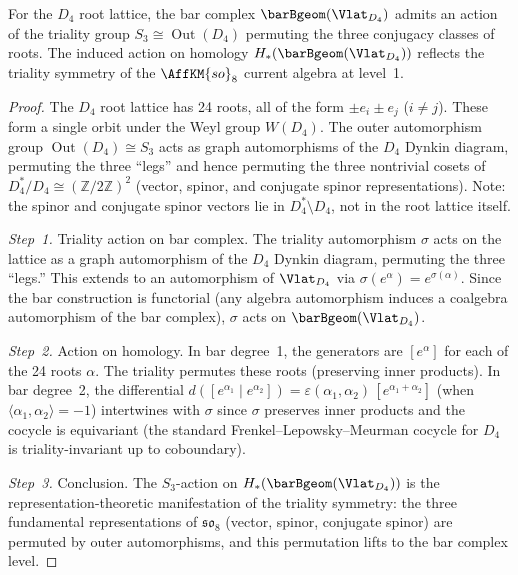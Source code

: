 \begin{proposition}
\label{prop:lattice:bar-D4}
For the $D_4$ root lattice, the bar complex
$\barBgeom(\Vlat_{D_4})$ admits an action of the triality group
$S_3 \cong \operatorname{Out}(D_4)$ permuting the three conjugacy classes of
roots. The induced action on homology
$H_*(\barBgeom(\Vlat_{D_4}))$ reflects the triality symmetry of the
$\AffKM{so}_8$ current algebra at level~1.
\end{proposition}

\begin{proof}
The $D_4$ root lattice has 24 roots, all of the form $\pm e_i \pm e_j$ ($i \neq j$). These form a single orbit under the Weyl group $W(D_4)$. The outer automorphism group $\operatorname{Out}(D_4) \cong S_3$ acts as graph automorphisms of the $D_4$ Dynkin diagram, permuting the three ``legs'' and hence permuting the three nontrivial cosets of $D_4^*/D_4 \cong (\mathbb{Z}/2\mathbb{Z})^2$ (vector, spinor, and conjugate spinor representations). Note: the spinor and conjugate spinor vectors lie in $D_4^* \setminus D_4$, not in the root lattice itself.

\emph{Step~1.} Triality action on bar complex.
The triality automorphism $\sigma$ acts on the lattice as a graph automorphism of the $D_4$ Dynkin diagram, permuting the three ``legs.'' This extends to an automorphism of $\Vlat_{D_4}$ via $\sigma(e^\alpha) = e^{\sigma(\alpha)}$. Since the bar construction is functorial (any algebra automorphism induces a coalgebra automorphism of the bar complex), $\sigma$ acts on $\barBgeom(\Vlat_{D_4})$.

\emph{Step~2.} Action on homology.
In bar degree~1, the generators are $[e^\alpha]$ for each of the 24 roots $\alpha$. The triality permutes these roots (preserving inner products). In bar degree~2, the differential $d([e^{\alpha_1} \mid e^{\alpha_2}]) = \varepsilon(\alpha_1,\alpha_2)\,[e^{\alpha_1+\alpha_2}]$ (when $\langle\alpha_1,\alpha_2\rangle = -1$) intertwines with $\sigma$ since $\sigma$ preserves inner products and the cocycle is equivariant (the standard Frenkel--Lepowsky--Meurman cocycle for $D_4$ is triality-invariant up to coboundary).

\emph{Step~3.} Conclusion.
The $S_3$-action on $H_*(\barBgeom(\Vlat_{D_4}))$ is the representation-theoretic manifestation of the triality symmetry: the three fundamental representations of $\mathfrak{so}_8$ (vector, spinor, conjugate spinor) are permuted by outer automorphisms, and this permutation lifts to the bar complex level.
\end{proof}

